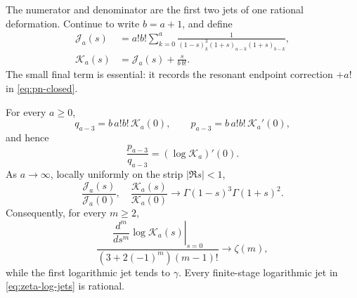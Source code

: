 The numerator and denominator are the first two jets of one rational
deformation.  Continue to write \(b=a+1\), and define
\begin{align}
 \mathscr J_a(s)&=a!b!\sum_{k=0}^a
 \frac1{(1-s)_k^3(1+s)_{a-k}(1+s)_{b-k}},
 \label{eq:Jas-def}\\
 \mathscr K_a(s)&=\mathscr J_a(s)+\frac{s}{b\,b!}.
 \label{eq:Kas-def}
\end{align}
The small final term is essential: it records the resonant endpoint
correction \(+a!\) in \eqref{eq:pn-closed}.

\begin{theorem}
\label{thm:gamma-jet}
For every \(a\ge0\),
\begin{equation}\label{eq:zero-first-jets}
 \boxed{\displaystyle
 q_{a-3}=b\,a!b!\,\mathscr K_a(0),\qquad
 p_{a-3}=b\,a!b!\,\mathscr K_a'(0),}
\end{equation}
and hence
\begin{equation}\label{eq:gamma-first-log-jet}
 \frac{p_{a-3}}{q_{a-3}}=(\log\mathscr K_a)'(0).
\end{equation}
As \(a\to\infty\), locally uniformly on the strip \(|\Re s|<1\),
\begin{equation}\label{eq:Gamma-master-limit}
 \boxed{\displaystyle
 \frac{\mathscr J_a(s)}{\mathscr J_a(0)},\quad
 \frac{\mathscr K_a(s)}{\mathscr K_a(0)}
 \longrightarrow
 \Gamma(1-s)^3\Gamma(1+s)^2.}
\end{equation}
Consequently, for every \(m\ge2\),
\begin{equation}\label{eq:zeta-log-jets}
 \boxed{\displaystyle
 \frac{\left.\dfrac{d^m}{ds^m}\log\mathscr K_a(s)\right|_{s=0}}
 {(3+2(-1)^m)(m-1)!}\longrightarrow\zeta(m),}
\end{equation}
while the first logarithmic jet tends to \(\gamma\).
Every finite-stage logarithmic jet in \eqref{eq:zeta-log-jets} is rational.
\end{theorem}

